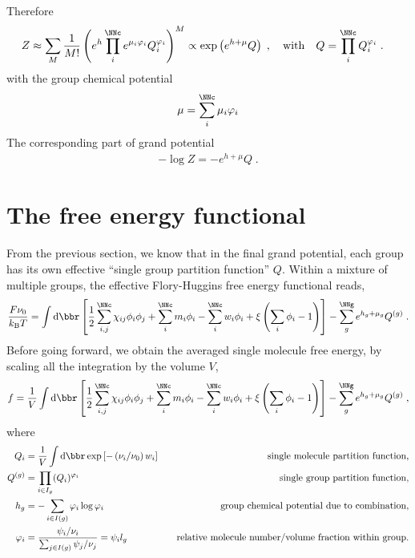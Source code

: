 \documentclass[aps,prl,reprint,onecolumn,groupedaddress,amsmath,amssymb]{revtex4-2}
\newcommand{\dd}{{\mathrm{d}}}
\newcommand{\kBT}{{k_{\mathrm{B}}T}}
\begin{document}
Therefore
\begin{align}
    Z & \approx \sum_{M} \frac{1}{M!} \left( e^{h} \prod_i^{\NNc} e^{\mu_i \varphi_i} Q_i^{\varphi_i} \right)^M \propto \exp \left( e^{h + \mu} Q \right)\;, \quad \mathrm{with} \quad Q = \prod_i^{\NNc} Q_i^{\varphi_i} \;.
\end{align}
with the group chemical potential
\begin{align}
    \mu = \sum_i^{\NNc} \mu_i \varphi_i
\end{align}
The corresponding part of grand potential
\begin{align}
    - \log Z = - e^{h + \mu}  Q \;.
\end{align}

\section{The free energy functional}
From the previous section, we know that in the final grand potential, each group has its own effective ``single group partition function'' $Q$.
Within a mixture of multiple groups, the effective Flory-Huggins free energy functional reads,
\begin{align}
    \frac{F \nu_0}{\kBT} = \int \dd \bbr \left[\frac{1}{2} \sum_{i,j}^{\NNc} \chi_{ij} \phi_i \phi_j + \sum_i^{\NNc}m_i \phi_i - \sum_i^{\NNc}w_i \phi_i + \xi \left(\sum_i \phi_i -1 \right) \right] - \sum_g^{\NNg} e^{h_g + \mu_g} Q^{(g)} \;.
\end{align}
Before going forward, we obtain the averaged single molecule free energy, by scaling all the integration by the volume $V$,
\begin{align}
    f = \frac{1}{V}\int \dd \bbr \left[\frac{1}{2} \sum_{i,j}^{\NNc} \chi_{ij} \phi_i \phi_j + \sum_i^{\NNc}m_i \phi_i - \sum_i^{\NNc}w_i \phi_i + \xi \left(\sum_i \phi_i -1 \right) \right] - \sum_g^{\NNg} e^{h_g + \mu_g} Q^{(g)} \;,
\end{align}
where
\begin{subequations}
    \begin{align}
        Q_i       & = \frac{1}{V}\int \dd \bbr \exp\left[-\left(\nu_i/\nu_0\right) w_i\right]  \quad & \text{single molecule partition function,}                    \\
        Q^{(g)}   & = \prod_{i \in I_g} (Q_i)^{\varphi_i} \quad                                      & \text{single group partition function,}                       \\
        h_g       & = - \sum_{i \in I(g)} \varphi_i \log \varphi_i              \quad                & \text{group chemical potential due to combination,}           \\
        \varphi_i & = \frac{\psi_i / \nu_i}{\sum_{j \in I(g)} \psi_j / \nu_j} = \psi_i l_g\quad                   & \text{relative molecule number/volume fraction within group.}
    \end{align}
\end{subequations}
\end{document}
